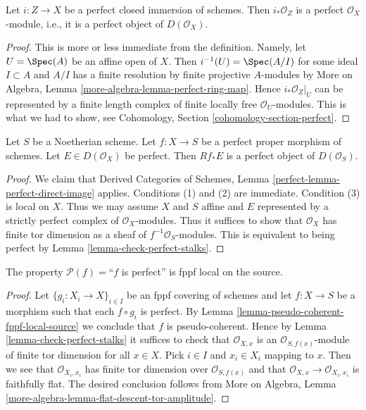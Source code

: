 \begin{lemma}
\label{lemma-perfect-closed-immersion-perfect-direct-image}
Let $i : Z \to X$ be a perfect closed immersion of schemes.
Then $i_*\mathcal{O}_Z$ is a perfect $\mathcal{O}_X$-module, i.e.,
it is a perfect object of $D(\mathcal{O}_X)$.
\end{lemma}

\begin{proof}
This is more or less immediate from the definition. Namely, let
$U = \Spec(A)$ be an affine open of $X$. Then $i^{-1}(U) = \Spec(A/I)$
for some ideal $I \subset A$ and $A/I$ has a finite resolution by
finite projective $A$-modules by
More on Algebra, Lemma \ref{more-algebra-lemma-perfect-ring-map}.
Hence $i_*\mathcal{O}_Z|_U$ can be represented by a finite
length complex of finite locally free $\mathcal{O}_U$-modules.
This is what we had to show, see
Cohomology, Section \ref{cohomology-section-perfect}.
\end{proof}

\begin{lemma}
\label{lemma-perfect-proper-perfect-direct-image}
Let $S$ be a Noetherian scheme. Let $f : X \to S$ be a perfect proper
morphism of schemes. Let $E \in D(\mathcal{O}_X)$ be perfect. Then
$Rf_*E$ is a perfect object of $D(\mathcal{O}_S)$.
\end{lemma}

\begin{proof}
We claim that Derived Categories of Schemes, Lemma
\ref{perfect-lemma-perfect-direct-image} applies.
Conditions (1) and (2) are immediate. Condition (3) is local
on $X$. Thus we may assume $X$ and $S$ affine and $E$
represented by a strictly perfect complex of $\mathcal{O}_X$-modules.
Thus it suffices to show that $\mathcal{O}_X$ has finite
tor dimension as a sheaf of $f^{-1}\mathcal{O}_S$-modules.
This is equivalent to being perfect by
Lemma \ref{lemma-check-perfect-stalks}.
\end{proof}

\begin{lemma}
\label{lemma-perfect-fppf-local-source}
The property $\mathcal{P}(f) =$``$f$ is perfect''
is fppf local on the source.
\end{lemma}

\begin{proof}
Let $\{g_i : X_i \to X\}_{i \in I}$ be an fppf covering of schemes and let
$f : X \to S$ be a morphism such that each $f \circ g_i$ is
perfect. By
Lemma \ref{lemma-pseudo-coherent-fppf-local-source}
we conclude that $f$ is pseudo-coherent.
Hence by
Lemma \ref{lemma-check-perfect-stalks}
it suffices to check that $\mathcal{O}_{X, x}$ is an
$\mathcal{O}_{S, f(x)}$-module of finite tor dimension for all $x \in X$.
Pick $i \in I$ and $x_i \in X_i$ mapping to $x$. Then we see that
$\mathcal{O}_{X_i, x_i}$ has finite tor dimension over
$\mathcal{O}_{S, f(x)}$ and that
$\mathcal{O}_{X, x} \to \mathcal{O}_{X_i, x_i}$ is faithfully flat.
The desired conclusion follows from
More on Algebra, Lemma \ref{more-algebra-lemma-flat-descent-tor-amplitude}.
\end{proof}

